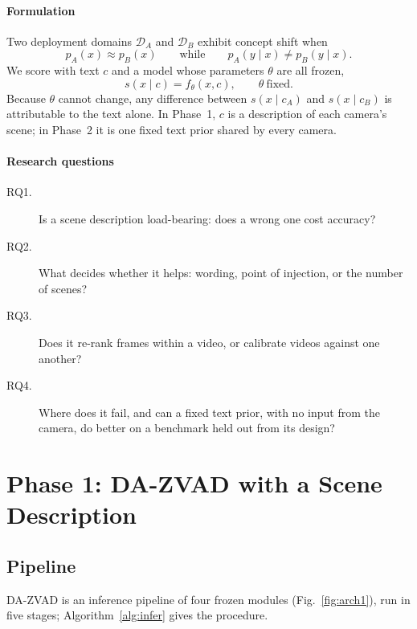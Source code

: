 \documentclass[conference,a4paper]{IEEEtran}
\begin{document}
\paragraph*{Formulation}
Two deployment domains $\mathcal{D}_A$ and $\mathcal{D}_B$ exhibit concept shift
when
\begin{equation}
p_A(x)\approx p_B(x) \qquad\text{while}\qquad p_A(y\mid x)\neq p_B(y\mid x).
\label{eq:conceptshift}
\end{equation}
We score with text $c$ and a model whose parameters $\theta$ are all frozen,
\begin{equation}
s(x\mid c) = f_\theta(x, c), \qquad \theta\ \text{fixed}.
\label{eq:score}
\end{equation}
Because $\theta$ cannot change, any difference between $s(x\mid c_A)$ and
$s(x\mid c_B)$ is attributable to the text alone. In Phase~1, $c$ is a
description of each camera's scene; in Phase~2 it is one fixed text prior
shared by every camera.

\paragraph*{Research questions}
\begin{description}
  \item[RQ1.] Is a scene description load-bearing: does a wrong one cost accuracy?
  \item[RQ2.] What decides whether it helps: wording, point of injection, or the
        number of scenes?
  \item[RQ3.] Does it re-rank frames within a video, or calibrate videos against
        one another?
  \item[RQ4.] Where does it fail, and can a fixed text prior, with no input from
        the camera, do better on a benchmark held out from its design?
\end{description}

\section{Phase 1: DA-ZVAD with a Scene Description}
\label{sec:p1-method}

\subsection{Pipeline}
DA-ZVAD is an inference pipeline of four frozen modules
(Fig.~\ref{fig:arch1}), run in five stages; Algorithm~\ref{alg:infer} gives the
procedure.
\end{document}

